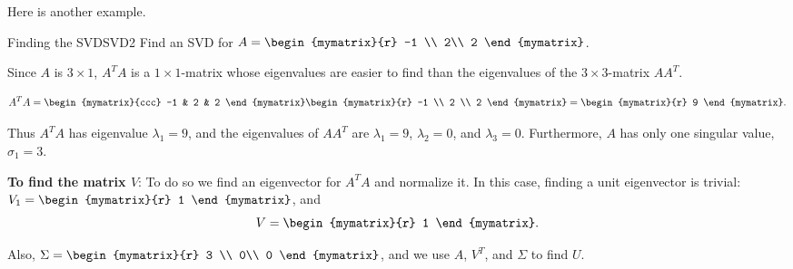 Here is another example.

\begin{example}{Finding the SVD}{SVD2}
Find an SVD for
$A=\begin{mymatrix}{r} -1 \\ 2\\ 2 \end{mymatrix}$.
\end{example}

\begin{solution}
Since $A$ is $3\times 1$, $A^T A$ is a $1\times 1$-matrix
whose eigenvalues are easier to find than the eigenvalues of
the $3\times 3$-matrix $AA^T$.

\[ A^TA=\begin{mymatrix}{ccc} -1 & 2 & 2 \end{mymatrix}
\begin{mymatrix}{r} -1 \\ 2 \\ 2 \end{mymatrix}
=\begin{mymatrix}{r} 9 \end{mymatrix}.\]

Thus $A^TA$ has eigenvalue $\lambda_1=9$, and
the eigenvalues of $AA^T$ are $\lambda_1=9$, $\lambda_2=0$, and
$\lambda_3=0$.
Furthermore, $A$ has only one singular value, $\sigma_1=3$.

{\bf To find the matrix $V$}:
To do so we find an eigenvector for $A^TA$ and
normalize it.
In this case, finding a unit eigenvector is trivial:
$V_1=\begin{mymatrix}{r} 1 \end{mymatrix}$, and
\[ V=\begin{mymatrix}{r} 1 \end{mymatrix}.\]

Also,
$\Sigma =\begin{mymatrix}{r} 3 \\ 0\\ 0 \end{mymatrix}$,
and we use $A$, $V^T$, and $\Sigma$ to find $U$.


\end{solution}
